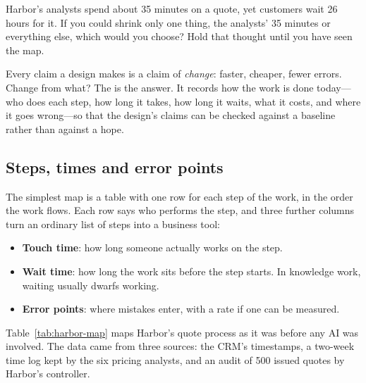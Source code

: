 \begin{thinkabout}
Harbor's analysts spend about 35 minutes on a quote, yet customers wait 26 hours for it. If you could shrink only one thing, the analysts' 35 minutes or everything else, which would you choose? Hold that thought until you have seen the map.
\end{thinkabout}

Every claim a design makes is a claim of \emph{change}: faster, cheaper, fewer errors. Change from what? The  is the answer. It records how the work is done today---who does each step, how long it takes, how long it waits, what it costs, and where it goes wrong---so that the design's claims can be checked against a baseline rather than against a hope.

\subsection{Steps, times and error points}

The simplest map is a table with one row for each step of the work, in the order the work flows. Each row says who performs the step, and three further columns turn an ordinary list of steps into a business tool:
\begin{itemize}[itemsep=1pt]
  \item \textbf{Touch time}: how long someone actually works on the step.
  \item \textbf{Wait time}: how long the work sits before the step starts. In knowledge work, waiting usually dwarfs working.
  \item \textbf{Error points}: where mistakes enter, with a rate if one can be measured.
\end{itemize}

Table~\ref{tab:harbor-map} maps Harbor's quote process as it was before any AI was involved. The data came from three sources: the CRM's timestamps, a two-week time log kept by the six pricing analysts, and an audit of 500 issued quotes by Harbor's controller.

